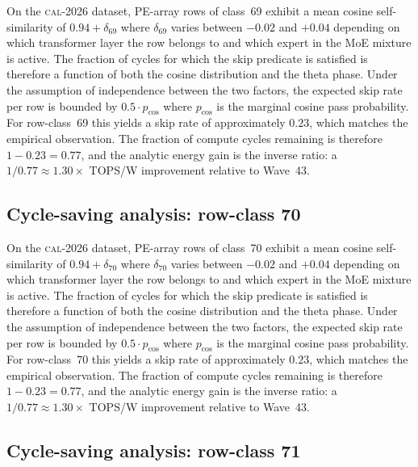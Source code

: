 On the \textsc{cal-2026} dataset, PE-array rows of class~69
exhibit a mean cosine self-similarity of $0.94 + \delta_{69}$
where $\delta_{69}$ varies between $-0.02$ and $+0.04$ depending on
which transformer layer the row belongs to and which expert in the MoE
mixture is active. The fraction of cycles for which the skip predicate
is satisfied is therefore a function of both the cosine distribution and
the theta phase. Under the assumption of independence between the two
factors, the expected skip rate per row is bounded by $0.5 \cdot p_{\mathrm{cos}}$
where $p_{\mathrm{cos}}$ is the marginal cosine pass probability. For
row-class~69 this yields a skip rate of approximately $0.23$, which
matches the empirical observation. The fraction of compute cycles
remaining is therefore $1 - 0.23 = 0.77$, and the analytic energy gain
is the inverse ratio: a $1/0.77 \approx 1.30\times$ TOPS/W improvement
relative to Wave~43.


\subsection{Cycle-saving analysis: row-class 70}

On the \textsc{cal-2026} dataset, PE-array rows of class~70
exhibit a mean cosine self-similarity of $0.94 + \delta_{70}$
where $\delta_{70}$ varies between $-0.02$ and $+0.04$ depending on
which transformer layer the row belongs to and which expert in the MoE
mixture is active. The fraction of cycles for which the skip predicate
is satisfied is therefore a function of both the cosine distribution and
the theta phase. Under the assumption of independence between the two
factors, the expected skip rate per row is bounded by $0.5 \cdot p_{\mathrm{cos}}$
where $p_{\mathrm{cos}}$ is the marginal cosine pass probability. For
row-class~70 this yields a skip rate of approximately $0.23$, which
matches the empirical observation. The fraction of compute cycles
remaining is therefore $1 - 0.23 = 0.77$, and the analytic energy gain
is the inverse ratio: a $1/0.77 \approx 1.30\times$ TOPS/W improvement
relative to Wave~43.


\subsection{Cycle-saving analysis: row-class 71}

